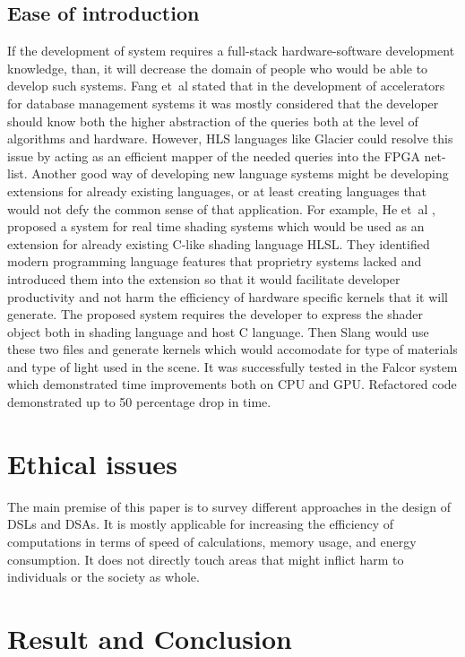\documentclass[conference]{IEEEtran}
\begin{document}
\subsection{Ease of introduction}
If the development of system requires a full-stack hardware-software development knowledge, than, it will decrease the domain of people who would be able to develop such systems. Fang et~al \cite{ref2} stated that in the development of accelerators for database management systems it was mostly considered that the developer should know both the higher abstraction of the queries both at the level of algorithms and hardware. However, HLS languages like Glacier could resolve this issue by acting as an efficient mapper of the needed queries into the FPGA net-list. 
Another good way of developing new language systems might be developing extensions for already existing languages, or at least creating languages that would not defy the common sense of that application. For example, He et~al \cite{ref3}, proposed a system for real time shading systems which would be used as an extension for already existing C-like shading language HLSL. They identified modern programming language features that proprietry systems lacked and introduced them into the extension so that it would facilitate developer productivity and not harm the efficiency of hardware specific kernels that it will generate. The proposed system requires the developer to express the shader object both in shading language and host C language. Then Slang would use these two files and generate kernels which would accomodate for type of materials and type of light used in the scene. It was successfully tested in the Falcor system which demonstrated time improvements both on CPU and GPU. Refactored code demonstrated up to 50 percentage drop in time.  

\section{Ethical issues}
The main premise of this paper is to survey different approaches in the design of DSLs and DSAs. It is mostly applicable for increasing the efficiency of computations in terms of speed of calculations, memory usage, and energy consumption. It does not directly touch areas that might inflict harm to individuals or the society as whole. 

\section{Result and Conclusion}
\end{document}

